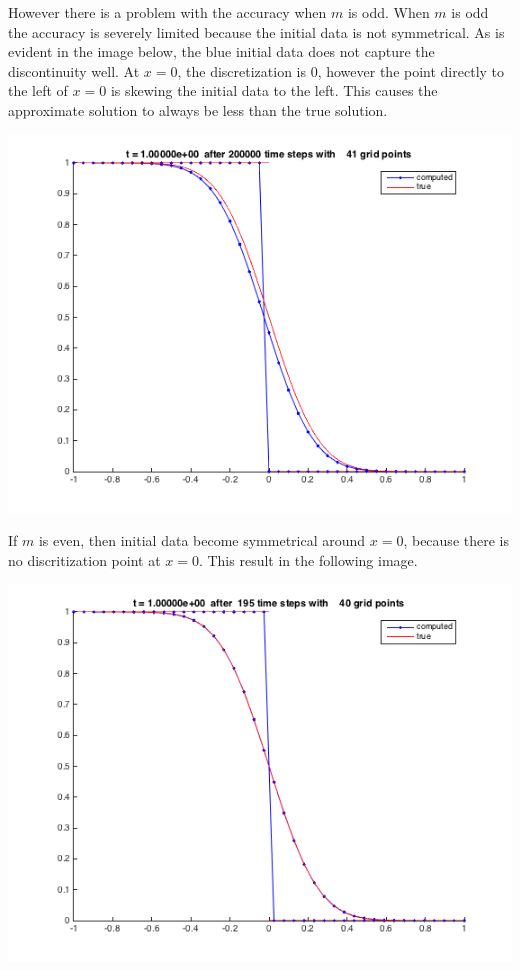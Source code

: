 \documentclass[11pt, oneside, titlepage]{article}
\begin{document}
\begin{enumerate}
\begin{enumerate}
\begin{enumerate}
                        However there is a problem with the accuracy when $m$ is odd.
                        When $m$ is odd the accuracy is severely limited because the
                        initial data is not symmetrical.
                        As is evident in the image below, the blue initial data
                        does not capture the discontinuity well.
                        At $x = 0$, the discretization is 0, however the point
                        directly to the left of $x = 0$ is skewing the initial data to
                        the left.
                        This causes the approximate solution to always be less than the
                        true solution.
                        \begin{center}
                            \includegraphics[scale=.7]{Figures/06_3_2.png}
                        \end{center}
                        If $m$ is even, then initial data become symmetrical around
                        $x = 0$, because there is no discritization point at $x = 0$.
                        This result in the following image.
                        \begin{center}
                            \includegraphics[scale=.7]{Figures/06_3_3.png}
                        \end{center}


\end{enumerate}
\end{enumerate}
\end{enumerate}
\end{document}
